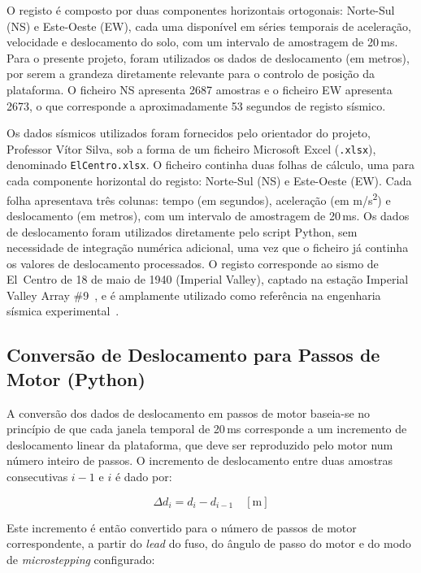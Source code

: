 O registo é composto por duas componentes horizontais ortogonais: Norte-Sul (NS) e Este-Oeste (EW), cada uma disponível em séries temporais de aceleração, velocidade e deslocamento do solo, com um intervalo de amostragem de 20\,ms. Para o presente projeto, foram utilizados os dados de deslocamento (em metros), por serem a grandeza diretamente relevante para o controlo de posição da plataforma. O ficheiro NS apresenta 2687 amostras e o ficheiro EW apresenta 2673, o que corresponde a aproximadamente 53 segundos de registo sísmico.

Os dados sísmicos utilizados foram fornecidos pelo orientador do projeto, Professor Vítor Silva, sob a forma de um ficheiro Microsoft Excel (\texttt{.xlsx}), denominado \texttt{ElCentro.xlsx}. O ficheiro continha duas folhas de cálculo, uma para cada componente horizontal do registo: Norte-Sul (NS) e Este-Oeste (EW). Cada folha apresentava três colunas: tempo (em segundos), aceleração (em m/s\textsuperscript{2}) e deslocamento (em metros), com um intervalo de amostragem de 20\,ms. Os dados de deslocamento foram utilizados diretamente pelo script Python, sem necessidade de integração numérica adicional, uma vez que o ficheiro já continha os valores de deslocamento processados. O registo corresponde ao sismo de El~Centro de 18 de maio de 1940 (Imperial Valley), captado na estação Imperial Valley Array \#9~\cite{ElCentro1940}, e é amplamente utilizado como referência na engenharia sísmica experimental~\cite{Damci2018, 2DOF2025}.


\subsection{Conversão de Deslocamento para Passos de Motor (Python)}
\label{subsec:conversao-python}

A conversão dos dados de deslocamento em passos de motor baseia-se no princípio de que cada janela temporal de 20\,ms corresponde a um incremento de deslocamento linear da plataforma, que deve ser reproduzido pelo motor num número inteiro de passos. O incremento de deslocamento entre duas amostras consecutivas $i-1$ e $i$ é dado por:

\begin{equation}
\Delta d_i = d_i - d_{i-1} \quad [\text{m}]
\label{eq:delta-deslocamento}
\end{equation}

Este incremento é então convertido para o número de passos de motor correspondente, a partir do \textit{lead} do fuso, do ângulo de passo do motor e do modo de \textit{microstepping} configurado:

